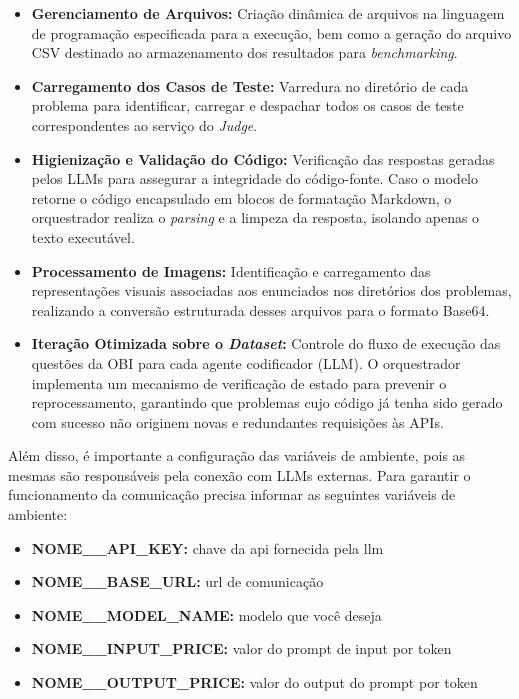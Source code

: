 \documentclass[sigconf,anonymous]{acmart} %
\begin{document}
\begin{itemize}
    \item \textbf{Gerenciamento de Arquivos:} Criação dinâmica de arquivos na linguagem de programação especificada para a execução, bem como a geração do arquivo CSV destinado ao armazenamento dos resultados para \textit{benchmarking}.
    
    \item \textbf{Carregamento dos Casos de Teste:} Varredura no diretório de cada problema para identificar, carregar e despachar todos os casos de teste correspondentes ao serviço do \textit{Judge}.
    
    \item \textbf{Higienização e Validação do Código:} Verificação das respostas geradas pelos LLMs para assegurar a integridade do código-fonte. Caso o modelo retorne o código encapsulado em blocos de formatação Markdown, o orquestrador realiza o \textit{parsing} e a limpeza da resposta, isolando apenas o texto executável.
    
    \item \textbf{Processamento de Imagens:} Identificação e carregamento das representações visuais associadas aos enunciados nos diretórios dos problemas, realizando a conversão estruturada desses arquivos para o formato Base64.
    
    \item \textbf{Iteração Otimizada sobre o \textit{Dataset}:} Controle do fluxo de execução das questões da OBI para cada agente codificador (LLM). O orquestrador implementa um mecanismo de verificação de estado para prevenir o reprocessamento, garantindo que problemas cujo código já tenha sido gerado com sucesso não originem novas e redundantes requisições às APIs.
\end{itemize}
Além disso, é importante a configuração das variáveis de ambiente, pois as mesmas são responsáveis pela conexão com LLMs externas.
Para garantir o funcionamento da comunicação precisa informar as seguintes variáveis de ambiente:
\begin{itemize}
    \item \textbf{NOME\_\_API\_KEY:} chave da api fornecida pela llm 
    \item \textbf{NOME\_\_BASE\_URL:} url de comunicação
    \item \textbf{NOME\_\_MODEL\_NAME:} modelo que você deseja 
    \item \textbf{NOME\_\_INPUT\_PRICE:} valor do prompt de input por token
    \item \textbf{NOME\_\_OUTPUT\_PRICE:} valor do output do prompt por token
\end{itemize} 
\end{document}
